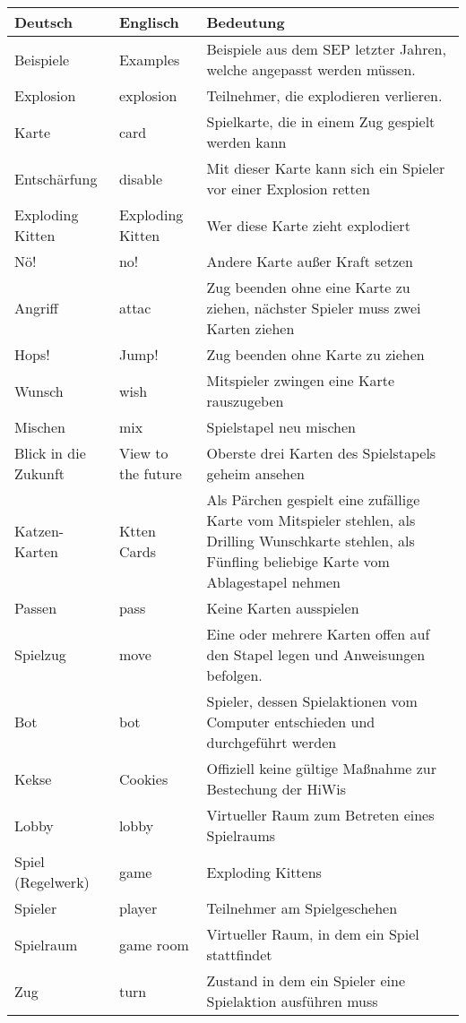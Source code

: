 \begin{center}
		\begin{longtable}{p{} p{} p{}}
			\textbf{Deutsch} & \textbf{Englisch} & \textbf{Bedeutung} \\
			\hline \hline \endhead
			Beispiele & Examples & Beispiele aus dem SEP letzter Jahren, welche angepasst werden müssen.\\
			Explosion & explosion & Teilnehmer, die explodieren verlieren. \\    
			Karte & card & Spielkarte, die in einem Zug gespielt werden kann\\
			Entschärfung & disable & Mit dieser Karte kann sich ein Spieler vor einer Explosion retten\\
			Exploding Kitten & Exploding Kitten & Wer diese Karte zieht explodiert\\
			Nö! & no! & Andere Karte außer Kraft setzen\\
			Angriff & attac & Zug beenden ohne eine Karte zu ziehen, nächster Spieler muss zwei Karten ziehen\\
			Hops! & Jump! & Zug beenden ohne Karte zu ziehen\\
			Wunsch & wish & Mitspieler zwingen eine Karte rauszugeben\\
			Mischen & mix & Spielstapel neu mischen\\
			Blick in die Zukunft & View to the future & Oberste drei Karten des Spielstapels geheim ansehen\\
			Katzen-Karten & Ktten Cards & Als Pärchen gespielt eine zufällige Karte vom Mitspieler stehlen, als Drilling Wunschkarte stehlen, als Fünfling beliebige Karte vom Ablagestapel nehmen\\
			
			Passen & pass & Keine Karten ausspielen\\
			Spielzug & move & Eine oder mehrere Karten offen auf den Stapel legen und Anweisungen befolgen. \\
			                
			Bot & bot & Spieler, dessen Spielaktionen vom Computer entschieden und durchgeführt werden\\
			Kekse & Cookies & Offiziell keine gültige Maßnahme zur Bestechung der HiWis\\          
 			Lobby & lobby & Virtueller Raum zum Betreten eines Spielraums\\	
			Spiel (Regelwerk) & game & Exploding Kittens \\
			Spieler & player & Teilnehmer am Spielgeschehen\\
			Spielraum & game room & Virtueller Raum, in dem ein Spiel stattfindet\\
			Zug & turn & Zustand in dem ein Spieler eine Spielaktion ausführen muss\\
		\end{longtable}
\end{center}


